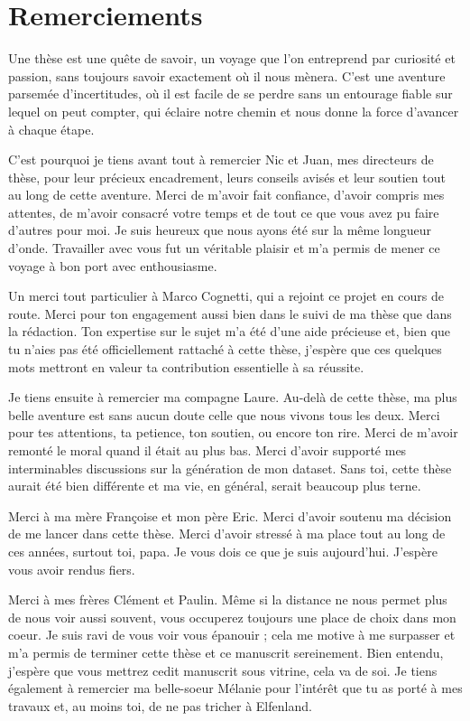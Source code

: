 \chapter*{Remerciements}

Une thèse est une quête de savoir, un voyage que l'on entreprend par curiosité et passion, sans toujours savoir exactement où il nous mènera.
C'est une aventure parsemée d'incertitudes, où il est facile de se perdre sans un entourage fiable sur lequel on peut compter, qui éclaire notre chemin et nous donne la force d'avancer à chaque étape.

C'est pourquoi je tiens avant tout à remercier Nic et Juan, mes directeurs de thèse, pour leur précieux encadrement, leurs conseils avisés et leur soutien tout au long de cette aventure.
Merci de m'avoir fait confiance, d'avoir compris mes attentes, de m'avoir consacré votre temps et de tout ce que vous avez pu faire d'autres pour moi.
Je suis heureux que nous ayons été sur la même longueur d’onde. 
Travailler avec vous fut un véritable plaisir et m’a permis de mener ce voyage à bon port avec enthousiasme.

Un merci tout particulier à Marco Cognetti, qui a rejoint ce projet en cours de route.
Merci pour ton engagement aussi bien dans le suivi de ma thèse que dans la rédaction.
Ton expertise sur le sujet m’a été d’une aide précieuse et, bien que tu n’aies pas été officiellement rattaché à cette thèse, j’espère que ces quelques mots mettront en valeur ta contribution essentielle à sa réussite.

Je tiens ensuite à remercier ma compagne Laure.
Au-delà de cette thèse, ma plus belle aventure est sans aucun doute celle que nous vivons tous les deux.
Merci pour tes attentions, ta petience, ton soutien, ou encore ton rire.
Merci de m'avoir remonté le moral quand il était au plus bas.
Merci d'avoir supporté mes interminables discussions sur la génération de mon dataset.
Sans toi, cette thèse aurait été bien différente et ma vie, en général, serait beaucoup plus terne.

Merci à ma mère Françoise et mon père Eric.
Merci d'avoir soutenu ma décision de me lancer dans cette thèse.
Merci d'avoir stressé à ma place tout au long de ces années, surtout toi, papa.
Je vous dois ce que je suis aujourd'hui.
J'espère vous avoir rendus fiers.

Merci à mes frères Clément et Paulin.
Même si la distance ne nous permet plus de nous voir aussi souvent, vous occuperez toujours une place de choix dans mon coeur.
Je suis ravi de vous voir vous épanouir ; cela me motive à me surpasser et m’a permis de terminer cette thèse et ce manuscrit sereinement.
Bien entendu, j'espère que vous mettrez cedit manuscrit sous vitrine, cela va de soi.
Je tiens également à remercier ma belle-soeur Mélanie pour l’intérêt que tu as porté à mes travaux et, au moins toi, de ne pas tricher à Elfenland.

